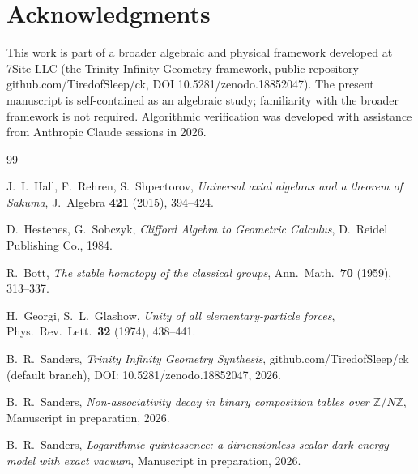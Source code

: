 \documentclass[11pt,reqno]{amsart}
\theoremstyle{plain}
\theoremstyle{definition}
\theoremstyle{remark}
\newcommand{\Z}{\mathbb{Z}}
\begin{document}
\section*{Acknowledgments}

This work is part of a broader algebraic and physical framework developed
at 7Site LLC (the Trinity Infinity Geometry framework, public repository
github.com/TiredofSleep/ck, DOI 10.5281/zenodo.18852047).  The present
manuscript is self-contained as an algebraic study; familiarity with the
broader framework is not required.  Algorithmic verification was developed
with assistance from Anthropic Claude sessions in 2026.

\begin{thebibliography}{99}

 J.~I.~Hall, F.~Rehren, S.~Shpectorov,
\emph{Universal axial algebras and a theorem of Sakuma},
J.~Algebra \textbf{421} (2015), 394--424.

 D.~Hestenes, G.~Sobczyk,
\emph{Clifford Algebra to Geometric Calculus},
D.~Reidel Publishing Co., 1984.

 R.~Bott,
\emph{The stable homotopy of the classical groups},
Ann.~Math.~\textbf{70} (1959), 313--337.

 H.~Georgi, S.~L.~Glashow,
\emph{Unity of all elementary-particle forces},
Phys.~Rev.~Lett.~\textbf{32} (1974), 438--441.

 B.~R.~Sanders,
\emph{Trinity Infinity Geometry Synthesis},
github.com/TiredofSleep/ck (default branch),
DOI: 10.5281/zenodo.18852047, 2026.

 B.~R.~Sanders,
\emph{Non-associativity decay in binary composition tables over $\Z/N\Z$},
Manuscript in preparation, 2026.

 B.~R.~Sanders,
\emph{Logarithmic quintessence: a dimensionless scalar dark-energy
model with exact vacuum},
Manuscript in preparation, 2026.

\end{thebibliography}
\end{document}
